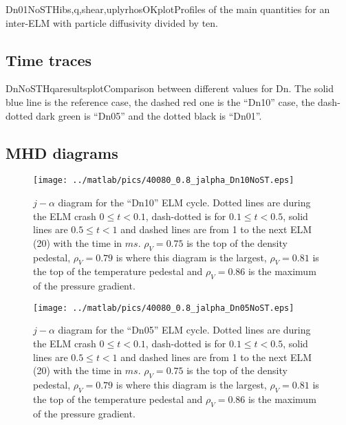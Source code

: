 \begin{AllFigs}{Dn01NoST}{H}{}{ibs,q,shear,upl}{y}{rhosOKplot}{Profiles of the main quantities for an inter-ELM with particle diffusivity divided by ten.}
\end{AllFigs}

\subsection{Time traces}\label{sec:app:graphs:recovery:Dn:traces}
\begin{AllFigs}{DnNoST}{H}{}{q}{a}{resultsplot}{Comparison between different values for Dn. The solid blue line is the reference case, the dashed red one is the ``Dn10'' case, the dash-dotted dark green is ``Dn05'' and the dotted black is ``Dn01''.}
\end{AllFigs}
\subsection{MHD diagrams}\label{sec:app:graphs:recovery:Dn:jalpha}
\begin{figure}[H]
\begin{center}
\texttt{[image: ../matlab/pics/40080\_0.8\_jalpha\_Dn10NoST.eps]}
\vspace{-0.5cm}
\end{center}
\caption{\footnotesize $j - \alpha$ diagram for the ``Dn10'' ELM cycle. Dotted lines are during the ELM crash $0 \le t <0.1$, dash-dotted is for $0.1 \le t < 0.5$, solid lines are $0.5 \le t < 1$ and dashed lines are from 1 to the next ELM (20) with the time in $ms$. $\rho_V = 0.75$ is the top of the density pedestal, $\rho_V = 0.79$ is where this diagram is the largest, $\rho_V = 0.81$ is the top of the temperature pedestal and $\rho_V = 0.86$ is the maximum of the pressure gradient.\label{fig:results:ELM:Dn10:jalpha}}
\vspace{-0.5cm}
\end{figure}
\begin{figure}[H]
\begin{center}
\texttt{[image: ../matlab/pics/40080\_0.8\_jalpha\_Dn05NoST.eps]}
\vspace{-0.5cm}
\end{center}
\caption{\footnotesize $j - \alpha$ diagram for the ``Dn05'' ELM cycle. Dotted lines are during the ELM crash $0 \le t <0.1$, dash-dotted is for $0.1 \le t < 0.5$, solid lines are $0.5 \le t < 1$ and dashed lines are from 1 to the next ELM (20) with the time in $ms$. $\rho_V = 0.75$ is the top of the density pedestal, $\rho_V = 0.79$ is where this diagram is the largest, $\rho_V = 0.81$ is the top of the temperature pedestal and $\rho_V = 0.86$ is the maximum of the pressure gradient.\label{fig:results:ELM:Dn05:jalpha}}
\vspace{-0.5cm}
\end{figure}
